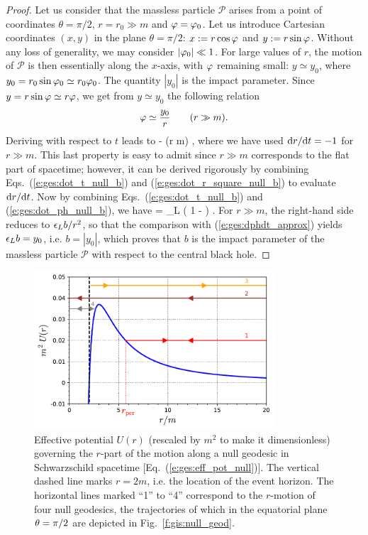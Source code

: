 \begin{proof}
Let us consider that the massless
particle $\mathscr{P}$ arises from a point of coordinates $\theta=\pi/2$,
$r=r_0 \gg m$ and $\varphi = \varphi_0$.  Let us introduce
Cartesian coordinates $(x,y)$ in the plane $\theta=\pi/2$:
$x:=r\cos\varphi$ and $y:=r\sin\varphi$.
Without any loss of generality, we may
consider $|\varphi_0| \ll 1$. For large values of $r$, the motion of
$\mathscr{P}$ is then essentially along the $x$-axis, with $\varphi$ remaining small:
$y\simeq y_0$, where
$y_0 = r_0 \sin\varphi_0 \simeq r_0 \varphi_0$. The quantity
$|y_0|$ is the impact parameter.
Since $y=r\sin\varphi\simeq r\varphi$, we get from $y\simeq y_0$
the following relation
\[
    \varphi \simeq \frac{y_0}{r} \qquad (r \gg m) .
\]
Deriving with respect to $t$ leads to
\be \label{e:ges:dphdt_approx}
     \simeq -  
                  \simeq {}  \qquad (r \gg m) ,
\ee
where we have used $\mathrm{d} r / \mathrm{d} t = - 1$ for $r \gg m$. This last property is easy
to admit since
$r\gg m$ corresponds to the flat part of spacetime; however, it can be derived
rigorously by combining Eqs.~(\ref{e:ges:dot_t_null_b}) and
(\ref{e:ges:dot_r_square_null_b}) to evaluate $\mathrm{d} r / \mathrm{d} t$.
Now by combining Eqs.~(\ref{e:ges:dot_t_null_b}) and (\ref{e:ges:dot_ph_null_b}),
we have
\be
     = \eps_L  \left( 1 -  \right) .
\ee
For $r\gg m$, the right-hand side reduces to $\epsilon_L b/r^2$, so that the comparison
with (\ref{e:ges:dphdt_approx}) yields $\epsilon_L b = y_0$, i.e. $b = |y_0|$,
which proves that $b$ is the impact
parameter of the massless particle $\mathscr{P}$ with respect to the central
black hole.
\end{proof}

\begin{figure}
\centerline{\includegraphics[width=0.8\textwidth]{ges_eff_pot_null.pdf}}
\caption[]{\label{f:gis:eff_pot_null} \footnotesize
Effective potential $U(r)$ (rescaled by $m^2$ to make it dimensionless)
governing the $r$-part of the
motion along a null geodesic in
Schwarzschild spacetime [Eq.~(\ref{e:ges:eff_pot_null})].
The vertical dashed line marks $r=2m$, i.e. the
location of the event horizon. The horizontal lines marked ``1'' to ``4''
correspond to the $r$-motion of four null geodesics,
the trajectories of which in the equatorial plane $\theta=\pi/2$
are depicted in Fig.~\ref{f:gis:null_geod}.}
\end{figure}

